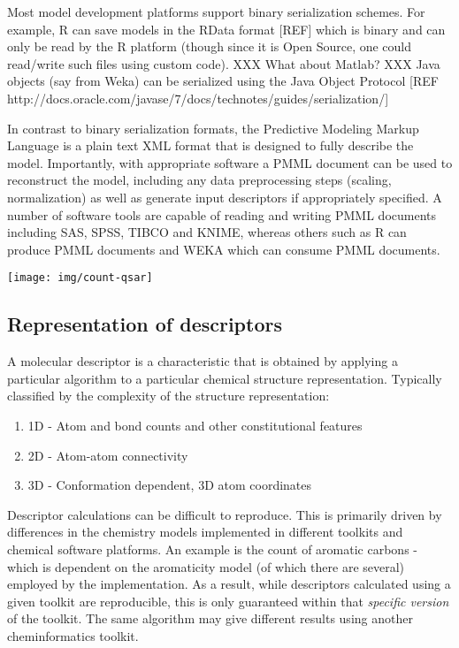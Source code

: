 \documentclass[12pt,letterpaper]{article}
\begin{document}
Most model development platforms support binary serialization
schemes. For example, R can save models in the RData format [REF]
which is binary and can only be read by the R platform (though since
it is Open Source, one could read/write such files using custom
code). XXX What about Matlab? XXX Java objects (say from Weka) can
be serialized using the Java Object Protocol [REF http://docs.oracle.com/javase/7/docs/technotes/guides/serialization/]

In contrast to binary serialization formats, the Predictive Modeling
Markup Language is a plain text XML format that is designed to fully
describe the model. Importantly, with appropriate software a PMML
document can be used to reconstruct the model, including any data
preprocessing steps (scaling, normalization) as well as generate input
descriptors if appropriately specified. A number of software tools are
capable of reading and writing PMML documents including SAS, SPSS,
TIBCO and KNIME, whereas others such as R can produce PMML documents
and WEKA which can consume PMML documents.

{}
{
  \texttt{[image: img/count-qsar]}
}

\subsection{Representation of descriptors}

A molecular descriptor is a characteristic that is obtained by applying
a particular algorithm to a particular chemical structure representation.
Typically classified by the complexity of the structure representation:
\begin{enumerate}
  \item 1D - Atom and bond counts and other constitutional features
  \item 2D - Atom-atom connectivity
  \item 3D - Conformation dependent, 3D atom coordinates
\end{enumerate}

Descriptor calculations can be difficult to reproduce. This is
primarily driven by differences in the chemistry models implemented in
different toolkits and chemical software platforms. An example is the
count of aromatic carbons - which is dependent on the aromaticity
model (of which there are several) employed by the implementation. As
a result, while descriptors calculated using a given toolkit are
reproducible, this is only guaranteed within that \emph{specific
  version} of the toolkit. The same algorithm may give different
results using another cheminformatics toolkit.
\end{document}
